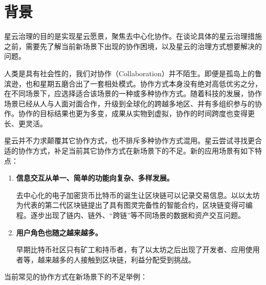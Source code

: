 \section{背景}

星云治理的目的是实现星云愿景，聚焦去中心化协作。在谈论具体的星云治理措施之前，需要先了解当前新场景下出现的协作困境，以及星云的治理方式想要解决的问题。

人类是具有社会性的，我们对协作（Collaboration）并不陌生。即便是孤岛上的鲁滨逊，也和星期五磨合出了一套相处模式。协作方式本身没有绝对高低优劣之分，在不同场景下，应选择适合该场景的一种或多种协作方式。随着科技的发展，协作场景已经从人与人面对面合作，升级到全球化的跨越多地区、并有多组织参与的协作。协作的目标结果也更为多变，成果从实物到虚拟，协作的时间跨度也变得更长、更灵活。

星云并不力求颠覆其它协作方式，也不排斥多种协作方式混用。星云尝试寻找更合适的协作方式，补足当前其它协作方式在新场景下的不足。新的应用场景有如下特点：

\begin{enumerate}
	\item \textbf{信息交互从单⼀、简单的功能向复杂、多样发展。}
	
	去中心化的电子加密货币比特币的诞生让区块链可以记录交易信息。以以太坊为代表的第二代区块链提出了具有图灵完备性的智能合约，区块链变得可编程。逐步出现了链内、链外、“跨链”等不同场景的数据和资产交互问题。

	\item \textbf{用户角色也随之越来越多。}

	早期比特币社区只有矿工和持币者，有了以太坊之后出现了开发者、应用使用者等，越来越多的人接触到区块链，利益分配受到挑战。

\end{enumerate}

当前常见的协作方式在新场景下的不足举例：

